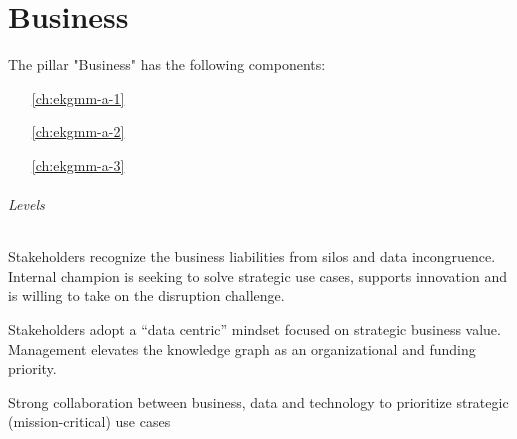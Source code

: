 \part{Business}\label{pt:ekgmm-a} %

The pillar "Business" has the following components:

\begin{itemize}[leftmargin=.5in]
    \item [\ref{ch:ekgmm-a-1}] 
    \item [\ref{ch:ekgmm-a-2}] 
    \item [\ref{ch:ekgmm-a-3}] 
\end{itemize}

\paragraph{Levels}

\begin{description}[nosep,font=\bfseries]

    \item [1. \glsfmtshort{ekg} Initiation, \glsfmtshort{mvp}]
    Stakeholders recognize the business liabilities from silos and data incongruence.
    Internal champion is seeking to solve strategic use cases, supports innovation and is willing
    to take on the disruption challenge.

    \item [2. Extensible Platform (reusable components)]
    Stakeholders adopt a “data centric” mindset focused on strategic business value.
    Management elevates the knowledge graph as an organizational and funding priority.

    \item [3. Enterprise Ready]
    Strong collaboration between business, data and technology to prioritize strategic
    (mission-critical) use cases

\end{description}





